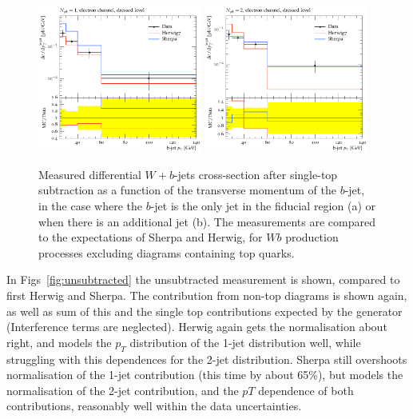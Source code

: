 \documentclass[11pt]{cernrep}
\begin{document}
\begin{figure}
\centering
	\includegraphics[width=0.48\textwidth]{subtracted_h7_s22-1jet.pdf}
	\includegraphics[width=0.48\textwidth]{subtracted_h7_s22-2jet.pdf}
\caption{\label{fig:subtracted}
Measured differential $W+b$-jets cross-section after single-top subtraction as a function of the transverse momentum of the $b$-jet, in the case where the $b$-jet is the only jet in the fiducial region (a) or when there is an additional jet (b). The measurements are compared to the expectations of Sherpa and Herwig, for $Wb$ production processes excluding diagrams containing top quarks.}
\end{figure}

In Figs~\ref{fig:unsubtracted} the unsubtracted measurement is shown, compared to first Herwig and Sherpa. The contribution from non-top diagrams is shown again, as well as sum
of this and the single top contributions expected by the generator (Interference terms are neglected). Herwig again gets the normalisation about right, and models the $p_T$ 
distribution of the 1-jet distribution well, while struggling with this dependences for the 2-jet distribution. Sherpa still overshoots normalisation of the 1-jet contribution 
(this time by about 65\%), but models the normalisation of the 2-jet contribution, and the $pT$ dependence of both contributions, reasonably well within the data uncertainties.
\end{document}
